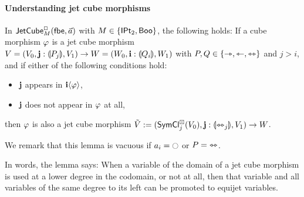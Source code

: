 \documentclass[a4paper]{memoir}
\begin{document}
\paragraph{Understanding jet cube morphisms}
\begin{lemma} \label{thm:left-of-concursor}
	In $\mathsf{JetCube}^{\Box}_{M}\mathopen{}\left( {\mathsf{fbe}},\vec a \right)\mathclose{}$ with $M \in \mathopen{}\left\{ {\mathsf{IPt}_2}, \mathsf{Boo} \right\}\mathclose{}$,
	the following holds:
	If a cube morphism $\varphi$ is a jet cube morphism $V = (V_0, \mathbf{j} : {\llparenthesis P_j \rrparenthesis}, V_1) \to W = (W_0, \mathbf{i} : {\llparenthesis Q_i \rrparenthesis}, W_1)$ with $P, Q \in \mathopen{}\left\{ \rightarrowtriangle, \leftarrowtriangle, \leftrightarrowtriangle \right\}\mathclose{}$ and $j > i$,
	and if either of the following conditions hold:
	\begin{itemize}
		\item $\mathbf{j}$ appears in $\mathbf{i} \langle \varphi \rangle$,
		\item $\mathbf{j}$ does not appear in $\varphi$ at all,
	\end{itemize}
	then $\varphi$ is also a jet cube morphism
	$\tilde V := (\mathsf{SymCl}^\boxdot_j(V_0), \mathbf{j} : {\llparenthesis \leftrightarrowtriangle_j \rrparenthesis}, V_1) \to W$.
\end{lemma}
We remark that this lemma is vacuous if $a_i = \npolar$ or $P = {\leftrightarrowtriangle}$.

In words, the lemma says: When a variable of the domain of a jet cube morphism is used at a lower degree in the codomain, or not at all, then that variable and all variables of the same degree to its left can be promoted to equijet variables.
\end{document}
